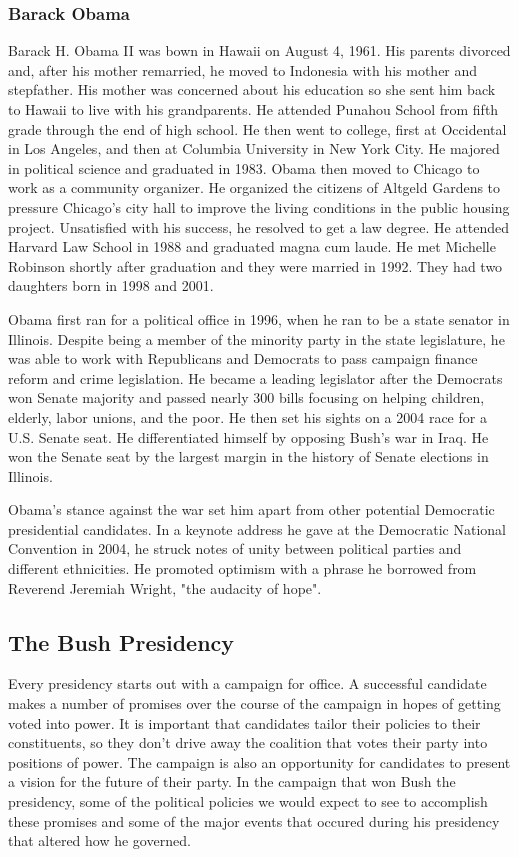 \documentclass{article}
\begin{document}
        \subsubsection{Barack Obama}
        Barack H. Obama II was bown in Hawaii on August 4, 1961. His parents divorced and, after his mother remarried, he moved to Indonesia with his mother and stepfather. His mother was concerned about his education so she sent him back to Hawaii to live with his grandparents. He attended Punahou School from fifth grade through the end of high school. He then went to college, first at Occidental in Los Angeles, and then at Columbia University in New York City. He majored in political science and graduated in 1983. Obama then moved to Chicago to work as a community organizer. He organized the citizens of Altgeld Gardens to pressure Chicago's city hall to improve the living conditions in the public housing project. Unsatisfied with his success, he resolved to get a law degree. He attended Harvard Law School in 1988 and graduated magna cum laude. He met Michelle Robinson shortly after graduation and they were married in 1992. They had two daughters born in 1998 and 2001.\cite{obamahistory}
        \par
        Obama first ran for a political office in 1996, when he ran to be a state senator in Illinois. Despite being a member of the minority party in the state legislature, he was able to work with Republicans and Democrats to pass campaign finance reform and crime legislation. He became a leading legislator after the Democrats won Senate majority and passed nearly 300 bills focusing on helping children, elderly, labor unions, and the poor. He then set his sights on a 2004 race for a U.S. Senate seat. He differentiated himself by opposing Bush's war in Iraq. He won the Senate seat by the largest margin in the history of Senate elections in Illinois.\cite{obamahistory}
        \par
        Obama's stance against the war set him apart from other potential Democratic presidential candidates. In a keynote address he gave at the Democratic National Convention in 2004, he struck notes of unity between political parties and different ethnicities. He promoted optimism with a phrase he borrowed from Reverend Jeremiah Wright, "the audacity of hope".\cite{obamahistory}

    \subsection{The Bush Presidency}
    Every presidency starts out with a campaign for office. A successful candidate makes a number of promises over the course of the campaign in hopes of getting voted into power. It is important that candidates tailor their policies to their constituents, so they don't drive away the coalition that votes their party into positions of power. The campaign is also an opportunity for candidates to present a vision for the future of their party. In the campaign that won Bush the presidency, some of the political policies we would expect to see to accomplish these promises and some of the major events that occured during his presidency that altered how he governed.
\end{document}
